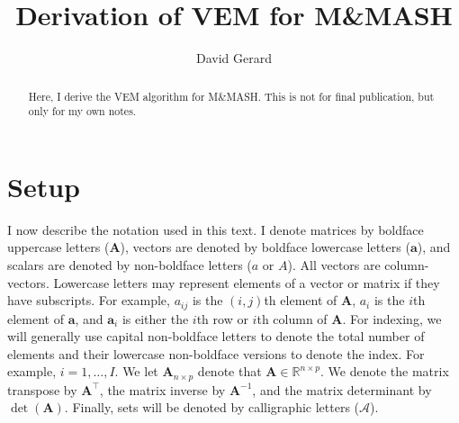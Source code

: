\documentclass[11pt,authoryear]{article}
\newcommand{\bs}[1]{\boldsymbol{#1}}
\begin{document}
\singlespacing
\title{Derivation of VEM for M\&MASH}
\author{David Gerard}
\maketitle

\begin{abstract}
  Here, I derive the VEM algorithm for M\&MASH. This is not for final
  publication, but only for my own notes.
\end{abstract}

\section{Setup}

I now describe the notation used in this text. I denote matrices by
boldface uppercase letters ($\bs{A}$), vectors are denoted by boldface
lowercase letters ($\bs{a}$), and scalars are denoted by non-boldface
letters ($a$ or $A$). All vectors are column-vectors. Lowercase
letters may represent elements of a vector or matrix if they have
subscripts. For example, $a_{ij}$ is the $(i,j)$th element of
$\bs{A}$, $a_i$ is the $i$th element of $\bs{a}$, and $\bs{a}_{i}$ is
either the $i$th row or $i$th column of $\bs{A}$. For indexing, we
will generally use capital non-boldface letters to denote the total
number of elements and their lowercase non-boldface versions to denote
the index. For example, $i = 1,\ldots,I$. We let $\bs{A}_{n \times p}$
denote that $\bs{A} \in \mathbb{R}^{n \times p}$. We denote the matrix
transpose by $\bs{A}^\intercal$, the matrix inverse by $\bs{A}^{-1}$,
and the matrix determinant by $\det(\bs{A})$. Finally, sets will be
denoted by calligraphic letters ($\mathcal{A}$).
\end{document}
